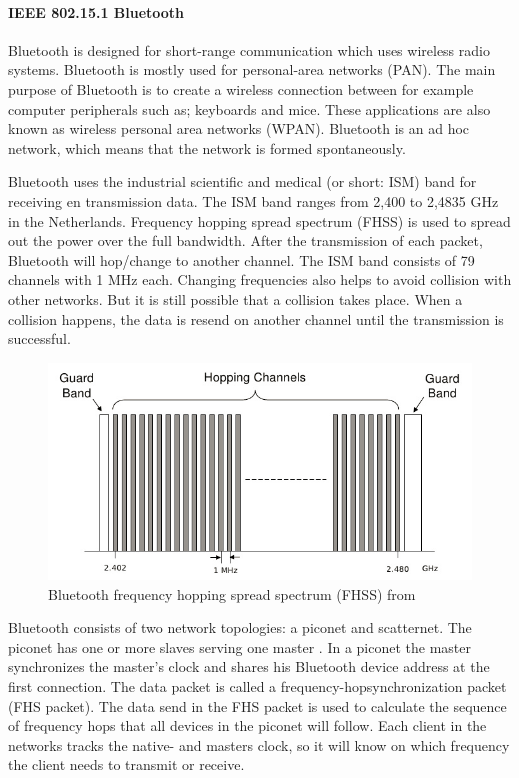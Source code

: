 \documentclass[10pt,a4paper]{article}
\begin{document}
\paragraph{IEEE 802.15.1 Bluetooth}
Bluetooth is designed for short-range communication which uses wireless radio systems. Bluetooth is mostly used for personal-area networks (PAN). \cite{combook} The main purpose of Bluetooth is to create a wireless connection between for example computer peripherals such as; keyboards and mice. These applications are also known as wireless personal area networks (WPAN). \cite{comparitivestudywirelessprotocols} Bluetooth is an ad hoc network, which means that the network is formed spontaneously.\cite{tcipbook}

Bluetooth uses the industrial scientific and medical (or short: ISM) band for receiving en transmission data. The ISM band ranges from 2,400 to 2,4835 GHz in the Netherlands. \cite{frequencyandsnetherlands} Frequency hopping spread spectrum (FHSS) is used to spread out the power over the full bandwidth. After the transmission of each packet, Bluetooth will hop/change to another channel. The ISM band consists of 79 channels with 1 MHz each. Changing frequencies also helps to avoid collision with other networks. But it is still possible that a collision takes place. When a collision happens, the data is resend on another channel until the transmission is successful.

\begin{figure}[H]
   \centering
   \includegraphics[width=1\textwidth]{Bluetoothfh}
   \caption{Bluetooth frequency hopping spread spectrum (FHSS) from \cite{Bluetoothspectrum}}
   \label{fig:Bluetoothfh}
\end{figure}

Bluetooth consists of two network topologies: a piconet and scatternet. The piconet has one or more slaves serving one master \cite{Bluetoothpiconet}. In a piconet the master synchronizes the master's clock and shares his Bluetooth device address at the first connection. The data packet is called a frequency-hopsynchronization packet (FHS packet). The data send in the FHS packet is used to calculate the sequence of frequency hops that all devices in the piconet will follow. Each client in the networks tracks the native- and masters clock, so it will know on which frequency the client needs to transmit or receive.
\end{document}
